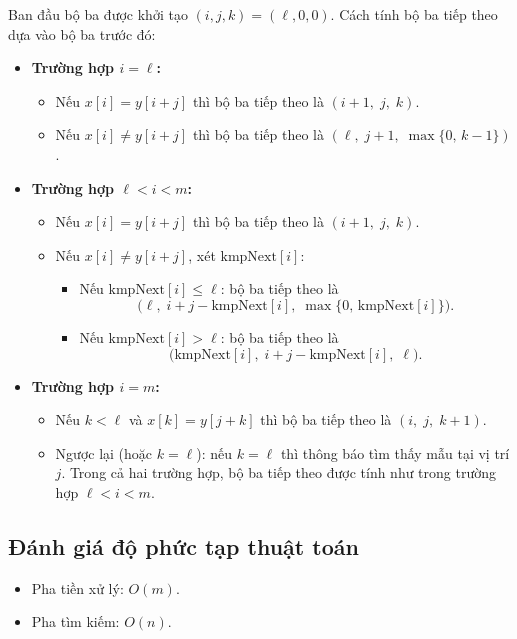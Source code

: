 \documentclass[12pt,twoside,openright]{extreport}
\begin{document}
Ban đầu bộ ba được khởi tạo $(i, j, k) = (\ell, 0, 0)$. Cách tính bộ ba tiếp theo dựa vào bộ ba trước đó:

\begin{itemize}
	\item \textbf{Trường hợp $i = \ell$:}
	\begin{itemize}
		\item Nếu $x[i] = y[i+j]$ thì bộ ba tiếp theo là $(i+1,\; j,\; k)$.
		\item Nếu $x[i] \neq y[i+j]$ thì bộ ba tiếp theo là $(\ell,\; j+1,\; \max\{0,\, k-1\})$.
	\end{itemize}
	\item \textbf{Trường hợp $\ell < i < m$:}
	\begin{itemize}
		\item Nếu $x[i] = y[i+j]$ thì bộ ba tiếp theo là $(i+1,\; j,\; k)$.
		\item Nếu $x[i] \neq y[i+j]$, xét $\text{kmpNext}[i]$:
		\begin{itemize}
			\item Nếu $\text{kmpNext}[i] \leq \ell$: bộ ba tiếp theo là
			\[
				\bigl(\ell,\; i+j-\text{kmpNext}[i],\; \max\{0,\, \text{kmpNext}[i]\}\bigr).
			\]
			\item Nếu $\text{kmpNext}[i] > \ell$: bộ ba tiếp theo là
			\[
				\bigl(\text{kmpNext}[i],\; i+j-\text{kmpNext}[i],\; \ell\bigr).
			\]
		\end{itemize}
	\end{itemize}
	\item \textbf{Trường hợp $i = m$:}
	\begin{itemize}
		\item Nếu $k < \ell$ và $x[k] = y[j+k]$ thì bộ ba tiếp theo là $(i,\; j,\; k+1)$.
		\item Ngược lại (hoặc $k = \ell$): nếu $k = \ell$ thì thông báo tìm thấy mẫu tại vị trí $j$. Trong cả hai trường hợp, bộ ba tiếp theo được tính như trong trường hợp $\ell < i < m$.
	\end{itemize}
\end{itemize}

\subsection{Đánh giá độ phức tạp thuật toán}

\begin{itemize}
	\item Pha tiền xử lý: $O(m)$.
	\item Pha tìm kiếm: $O(n)$.
\end{itemize}
\end{document}
